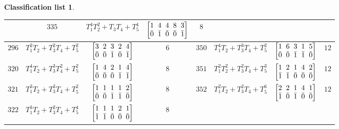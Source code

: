 \documentclass[10pt,a4paper]{amsart}
\theoremstyle{definition}
\newtheorem{class-list}[thm]{Classification list}
\numberwithin{equation}{section}
\begin{document}
\begin{class-list}
\begin{table}[h!]
\begin{tabu}{c|c|c|c||c|c|c|c}
&${335}$&${T_{1}^{4}T_{2}^{2}+T_{3}T_{4}+T_{5}^{4}}$
&$\arraycolsep=1mm\begin{bmatrix}{1} & {4} & {4} & {8} & {3} \\ {\bar{0}} & {\bar{1}} & {\bar{0}} & {\bar{0}} & {\bar{1}}\end{bmatrix}$&${8}$
\\
\hline
${296}$&${T_{1}^{2}T_{2}+T_{3}^{2}T_{4}+T_{5}^{2}}$
&$\arraycolsep=1mm\begin{bmatrix}{3} & {2} & {3} & {2} & {4} \\ {\bar{0}} & {\bar{0}} & {\bar{1}} & {\bar{0}} & {\bar{1}}\end{bmatrix}$&${6}$
&${350}$&${T_{1}^{4}T_{2}+T_{3}^{3}T_{4}+T_{5}^{2}}$
&$\arraycolsep=1mm\begin{bmatrix}{1} & {6} & {3} & {1} & {5} \\ {\bar{0}} & {\bar{0}} & {\bar{1}} & {\bar{1}} & {\bar{0}}\end{bmatrix}$&${12}$
\\
\hline
${320}$&${T_{1}^{4}T_{2}+T_{3}^{3}T_{4}^{2}+T_{5}^{2}}$
&$\arraycolsep=1mm\begin{bmatrix}{1} & {4} & {2} & {1} & {4} \\ {\bar{0}} & {\bar{0}} & {\bar{0}} & {\bar{1}} & {\bar{1}}\end{bmatrix}$&${8}$
&${351}$&${T_{1}^{2}T_{2}^{2}+T_{3}^{2}T_{4}+T_{5}^{3}}$
&$\arraycolsep=1mm\begin{bmatrix}{1} & {2} & {1} & {4} & {2} \\ {\bar{1}} & {\bar{1}} & {\bar{0}} & {\bar{0}} & {\bar{0}}\end{bmatrix}$&${12}$
\\
\hline
${321}$&${T_{1}^{3}T_{2}+T_{3}^{3}T_{4}+T_{5}^{2}}$
&$\arraycolsep=1mm\begin{bmatrix}{1} & {1} & {1} & {1} & {2} \\ {\bar{0}} & {\bar{0}} & {\bar{1}} & {\bar{1}} & {\bar{0}}\end{bmatrix}$&${8}$
&${352}$&${T_{1}^{2}T_{2}+T_{3}^{2}T_{4}+T_{5}^{6}}$
&$\arraycolsep=1mm\begin{bmatrix}{2} & {2} & {1} & {4} & {1} \\ {\bar{1}} & {\bar{0}} & {\bar{1}} & {\bar{0}} & {\bar{0}}\end{bmatrix}$&${12}$
\\
\hline
${322}$&${T_{1}^{3}T_{2}+T_{3}^{2}T_{4}+T_{5}^{4}}$
&$\arraycolsep=1mm\begin{bmatrix}{1} & {1} & {1} & {2} & {1} \\ {\bar{1}} & {\bar{1}} & {\bar{0}} & {\bar{0}} & {\bar{0}}\end{bmatrix}$&${8}$

\end{tabu}
\end{table}
\end{class-list}
\end{document}
